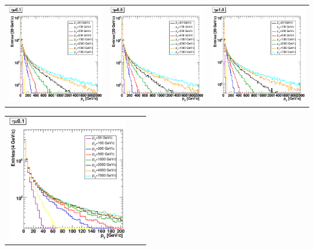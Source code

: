 \documentclass{cmspaper}
\begin{document}
\begin{appendices}
\begin{center}
\begin{tabular}{lll}
 \includegraphics[width=2in]{figs/h_ConstituentpT_ET_py_corr_eta0.1.eps} &
 \includegraphics[width=2in]{figs/h_ConstituentpT_ET_py_corr_eta0.5.eps} &
 \includegraphics[width=2in]{figs/h_ConstituentpT_ET_py_corr_eta1.0.eps} \\
\end{tabular}
\end{center}
\begin{center}
\begin{tabular}{lll}
 \includegraphics[width=2in]{figs/h_ConstituentpT_ET_py_corr_eta0.1_zoomed.eps} &

\end{tabular}
\end{center}
\end{appendices}
\end{document}
